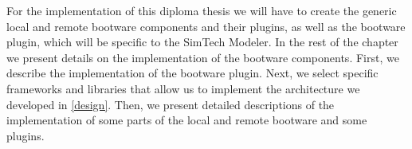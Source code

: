 For the implementation of this diploma thesis we will have to create the generic local and remote bootware components and their plugins, as well as the bootware plugin, which will be specific to the SimTech Modeler.
In the rest of the chapter we present details on the implementation of the bootware components.
First, we describe the implementation of the bootware plugin.
Next, we select specific frameworks and libraries that allow us to implement the architecture we developed in \autoref{design}.
Then, we present detailed descriptions of the implementation of some parts of the local and remote bootware and some plugins.
